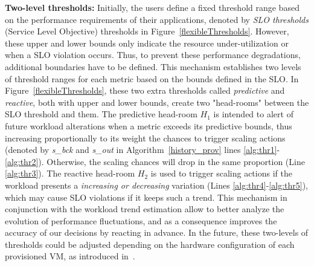 
\textbf{Two-level thresholds:} Initially, the users define a fixed
threshold range based on the performance requirements of their
applications, denoted by \emph{SLO thresholds} (Service Level Objective)
thresholds in Figure~\ref{flexibleThresholds}. However, these upper
and lower bounds only indicate the resource under-utilization or when a SLO violation occurs. Thus, to
prevent these performance degradations, additional boundaries have to be defined. This
mechanism establishes two levels of threshold ranges for each metric
based on the bounds defined in the SLO. In
Figure~\ref{flexibleThresholds}, these two extra thresholds called
\emph{predictive} and \emph{reactive}, both with upper and lower
bounds, create two "head-rooms" between the SLO threshold and
them. The predictive head-room $H_1$ is intended to alert of future
workload alterations when a metric exceeds its predictive bounds, thus
increasing proportionally to its weight the chances to trigger scaling
actions (denoted by \emph{s\_bck} and \emph{s\_out} in
Algorithm~\ref{history_prov} lines
\ref{alg:thr1}-\ref{alg:thr2}). Otherwise, the scaling chances will
drop in the same proportion (Line \ref{alg:thr3}). The reactive
head-room $H_2$ is used to trigger scaling actions if the workload
presents a \emph{increasing or decreasing} variation (Lines
\ref{alg:thr4}-\ref{alg:thr5}), which may cause SLO violations if it keeps such a trend. This mechanism in conjunction with the
workload trend estimation allow to better analyze the evolution of
performance fluctuations, and as a consequence improves the accuracy
of our decisions by reacting in advance. In the future, these two-levels of thresholds could
be adjusted depending on the hardware configuration of each
provisioned VM, as introduced in~\cite{beloglazov_adaptive_2010}.

